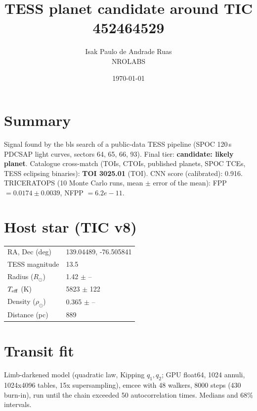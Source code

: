 \documentclass[11pt,a4paper]{article}
\title{TESS planet candidate around TIC 452464529}
\author{Isak Paulo de Andrade Ruas \\ NROLABS}
\date{\today}
\begin{document}
\maketitle

\section*{Summary}
Signal found by the bls search of a public-data TESS pipeline
(SPOC 120\,s PDCSAP light curves, sectors 64, 65, 66, 93).
Final tier: \textbf{candidate: likely planet}.
Catalogue cross-match (TOIs, CTOIs, published planets, SPOC TCEs, TESS eclipsing binaries):
\textbf{TOI 3025.01} (TOI).
CNN score (calibrated): 0.916.
TRICERATOPS (10 Monte Carlo runs, mean $\pm$ error of the mean):
FPP $= 0.0174 \pm 0.0039$,
NFPP $= 6.2e-11$.

\section*{Host star (TIC v8)}
\begin{tabular}{ll}\toprule
RA, Dec (deg) & 139.04489, -76.505841 \\
TESS magnitude & 13.5 \\
Radius ($R_\odot$) & 1.42 $\pm$ -- \\
$T_{\rm eff}$ (K) & 5823 $\pm$ 122 \\
Density ($\rho_\odot$) & 0.365 $\pm$ -- \\
Distance (pc) & 889 \\\bottomrule
\end{tabular}

\section*{Transit fit}
Limb-darkened model (quadratic law, Kipping $q_1,q_2$; GPU float64, 1024 annuli, 1024x4096 tables, 15x supersampling), emcee with 48 walkers,
8000 steps (430 burn-in), run until the chain exceeded 50 autocorrelation times.
Medians and 68\% intervals.
\end{document}
